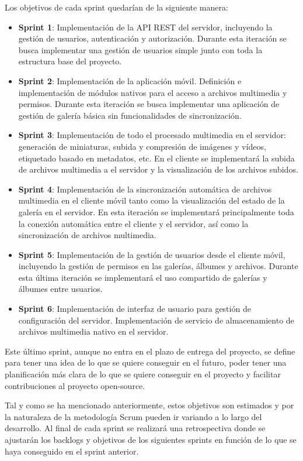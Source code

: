 Los objetivos de cada sprint quedarían de la siguiente manera:
\begin{itemize}
    \item \textbf{Sprint 1}: Implementación de la API REST del servidor, incluyendo la gestión de usuarios, autenticación y autorización. Durante esta iteración se busca implementar una gestión de usuarios simple junto con toda la estructura base del proyecto.
    \item \textbf{Sprint 2}: Implementación de la aplicación móvil. Definición e implementación de módulos nativos para el acceso a archivos multimedia y permisos. Durante esta iteración se busca implementar una aplicación de gestión de galería básica sin funcionalidades de sincronización.
    \item \textbf{Sprint 3}: Implementación de todo el procesado multimedia en el servidor: generación de miniaturas, subida y compresión de imágenes y vídeos, etiquetado basado en metadatos, etc. En el cliente se implementará la subida de archivos multimedia a el servidor y la visualización de los archivos subidos.
    \item \textbf{Sprint 4}: Implementación de la sincronización automática de archivos multimedia en el cliente móvil tanto como la visualización del estado de la galería en el servidor. En esta iteración se implementará principalmente toda la conexión automática entre el cliente y el servidor, así como la sincronización de archivos multimedia.
    \item \textbf{Sprint 5}: Implementación de la gestión de usuarios desde el cliente móvil, incluyendo la gestión de permisos en las galerías, álbumes y archivos. Durante esta última iteración se implementará el uso compartido de galerías y álbumes entre usuarios.
    \item \textbf{Sprint 6}: Implementación de interfaz de usuario para gestión de configuración del servidor. Implementación de servicio de almacenamiento de archivos multimedia nativo en el servidor.
\end{itemize}
Este último sprint, aunque no entra en el plazo de entrega del proyecto, se define para tener una idea de lo que se quiere conseguir en el futuro, poder tener una planificación más clara de lo que se quiere conseguir en el proyecto y facilitar contribuciones al proyecto open-source.

Tal y como se ha mencionado anteriormente, estos objetivos son estimados y por la naturaleza de la metodología Scrum pueden ir variando a lo largo del desarrollo. Al final de cada sprint se realizará una retrospectiva donde se ajustarán los backlogs y objetivos de los siguientes sprints en función de lo que se haya conseguido en el sprint anterior.

